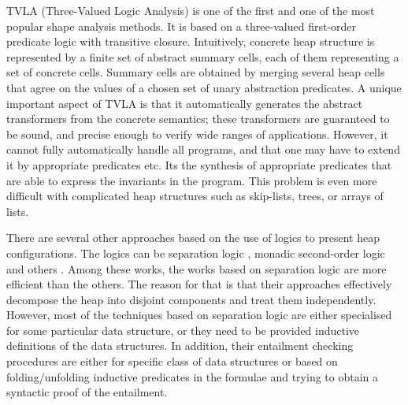 TVLA (Three-Valued Logic Analysis) \cite{SagivRW02} is one of the first and one of the most popular shape analysis
methods. It is based on a three-valued first-order predicate logic with transitive closure. Intuitively, concrete heap structure is represented by a finite set of abstract summary cells, each of them representing a set of concrete cells. Summary cells are obtained by merging several heap cells that agree on the values of a chosen set of unary abstraction predicates.  %
A unique important aspect of TVLA is that it automatically generates the abstract transformers from the concrete semantics; these transformers are guaranteed to be sound, and precise enough to verify wide ranges of applications. However, it cannot fully automatically handle all programs, and that one may have to extend it by appropriate predicates etc. Its the synthesis of appropriate predicates that are able to express the invariants in the program. This problem is even more difficult with complicated heap structures such as skip-lists, trees, or arrays of lists.  

There are several other approaches
 based on the use of logics to present heap configurations. The logics can be separation logic \cite{John:SL, Stephen:SL,JoshCris:SL,Hongseok:SL,Kamil:SL,Chin:SL,Quang:SL, Ruzica:SL, Constrantin:SL}, monadic second-order
 logic \cite{Ander:ML, Jakob:ML,Madhusudan:ML} and others \cite{Shmuel:Shape, Karen:Shape}. Among these works, the works based on separation logic are
  more efficient than the others. 
  The reason for that is that their approaches effectively decompose the heap into disjoint components and treat them independently. However, most of the techniques based on separation logic are either specialised for some particular data structure, or they need to be provided inductive definitions of the data structures. In addition, their entailment checking procedures are either for specific class of data structures or based on folding/unfolding inductive predicates in the formulae and trying to obtain a syntactic proof of the entailment. 

